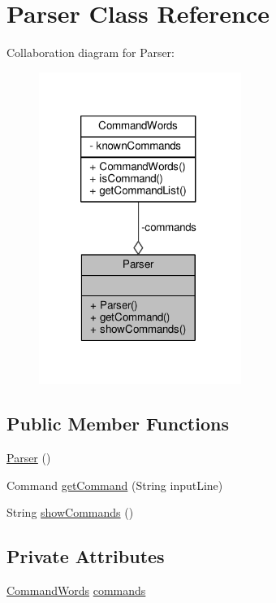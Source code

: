 \hypertarget{classParser}{\section{Parser Class Reference}
\label{classParser}
}


Collaboration diagram for Parser\-:
\nopagebreak
\begin{figure}[H]
\begin{center}
\leavevmode
\includegraphics[width=187pt]{classParser__coll__graph}
\end{center}
\end{figure}
\subsection*{Public Member Functions}
\begin{DoxyCompactItemize}
\item 
\hyperlink{classParser_a5b20dc7a1c7a26ce3cec6cc070839bd4}{Parser} ()
\item 
Command \hyperlink{classParser_a5ee0a1ad3df67b8814d34c81e7276371}{get\-Command} (String input\-Line)
\item 
String \hyperlink{classParser_ae99d8549c08045804cc52576d7b4b453}{show\-Commands} ()
\end{DoxyCompactItemize}
\subsection*{Private Attributes}
\begin{DoxyCompactItemize}
\item 
\hyperlink{classCommandWords}{Command\-Words} \hyperlink{classParser_a6afb99e1595e6bc0705a09ee00dbddd6}{commands}
\end{DoxyCompactItemize}



